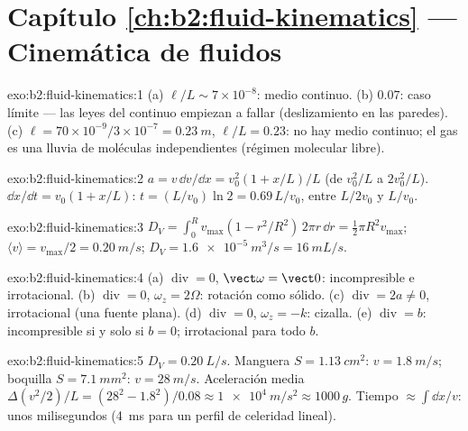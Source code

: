 \section*{Capítulo \ref{ch:b2:fluid-kinematics} --- Cinemática de fluidos}

\begin{solution}{exo:b2:fluid-kinematics:1}
(a) $\ell/L \sim 7 \times 10^{-8}$: medio continuo. (b) $0.07$: caso límite
--- las leyes del continuo empiezan a fallar (deslizamiento en las
paredes). (c) $\ell = 70 \times 10^{-9}
/3 \times 10^{-7} = \qty{0.23}{m}$, $\ell/L = 0.23$: no hay medio continuo; el gas es
una lluvia de moléculas independientes (régimen molecular libre).
\end{solution}

\begin{solution}{exo:b2:fluid-kinematics:2}
$a = v\,\dd v/\dd x = v_0^2(1 + x/L)/L$ (de $v_0^2/L$ a $2v_0^2/L$).
$\dd x/\dd t = v_0(1 + x/L)$: $t = (L/v_0)\ln2 = 0.69\,L/v_0$, entre
$L/2v_0$ y $L/v_0$.
\end{solution}

\begin{solution}{exo:b2:fluid-kinematics:3}
$D_V = \int_0^Rv_{\max}(1 - r^2/R^2)\,2\pi r\,\dd r = \tfrac12\pi R^2v_{\max}$;
$\langle v\rangle = v_{\max}/2 = \qty{0.20}{m/s}$; $D_V = \qty{1.6e-5}{m^3/s} =
\qty{16}{mL/s}$.
\end{solution}

\begin{solution}{exo:b2:fluid-kinematics:4}
(a) $\operatorname{div} = 0$, $\vect\omega = \vect 0$: incompresible e
irrotacional. (b) $\operatorname{div} = 0$, $\omega_z = 2\Omega$: rotación
como sólido. (c) $\operatorname{div} = 2a \ne 0$, irrotacional (una fuente
plana). (d) $\operatorname{div} = 0$, $\omega_z = -k$: cizalla. (e)
$\operatorname{div} = b$: incompresible si y solo si $b = 0$; irrotacional
para todo $b$.
\end{solution}

\begin{solution}{exo:b2:fluid-kinematics:5}
$D_V = \qty{0.20}{L/s}$. Manguera $S = \qty{1.13}{cm^2}$: $v = \qty{1.8}{m/s}$; boquilla
$S = \qty{7.1}{mm^2}$: $v = \qty{28}{m/s}$. Aceleración media $\Delta(v^2/2)/L
= (28^2 - 1.8^2)/0.08 \approx \qty{1e4}{m/s^2} \approx 1000\,g$. Tiempo $\approx
\int\dd x/v$: unos milisegundos (\qty{4}{ms} para un perfil de celeridad lineal).
\end{solution}

